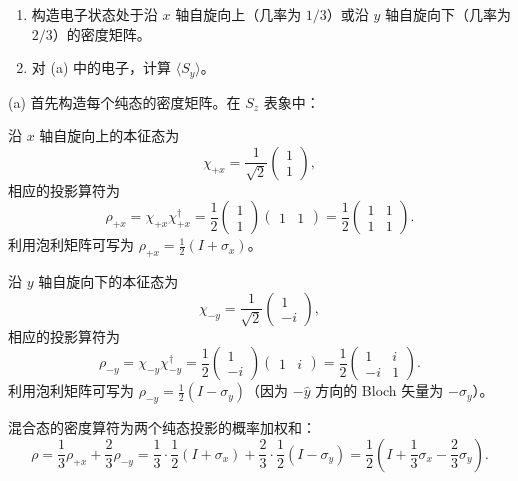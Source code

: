 \begin{question}
\begin{enumerate}
\item 构造电子状态处于沿 $x$ 轴自旋向上（几率为 $1/3$）或沿 $y$ 轴自旋向下（几率为 $2/3$）的密度矩阵。
\item 对 (a) 中的电子，计算 $\langle S_y\rangle$。
\end{enumerate}
\end{question}
\begin{solution}
(a) 首先构造每个纯态的密度矩阵。在 $S_z$ 表象中：

沿 $x$ 轴自旋向上的本征态为
\[
\chi_{+x} = \frac{1}{\sqrt{2}}\begin{pmatrix}1\\1\end{pmatrix},
\]
相应的投影算符为
\[
\rho_{+x} = \chi_{+x}\chi_{+x}^\dagger
= \frac{1}{2}\begin{pmatrix}1\\1\end{pmatrix}\begin{pmatrix}1&1\end{pmatrix}
= \frac{1}{2}\begin{pmatrix}1&1\\1&1\end{pmatrix}.
\]
利用泡利矩阵可写为 $\rho_{+x} = \frac{1}{2}(I+\sigma_x)$。

沿 $y$ 轴自旋向下的本征态为
\[
\chi_{-y} = \frac{1}{\sqrt{2}}\begin{pmatrix}1\\-i\end{pmatrix},
\]
相应的投影算符为
\[
\rho_{-y} = \chi_{-y}\chi_{-y}^\dagger
= \frac{1}{2}\begin{pmatrix}1\\-i\end{pmatrix}\begin{pmatrix}1&i\end{pmatrix}
= \frac{1}{2}\begin{pmatrix}1&i\\-i&1\end{pmatrix}.
\]
利用泡利矩阵可写为 $\rho_{-y} = \frac{1}{2}(I-\sigma_y)$（因为 $-\hat y$ 方向的 Bloch 矢量为 $-\sigma_y$）。

混合态的密度算符为两个纯态投影的概率加权和：
\[
\rho = \frac{1}{3}\rho_{+x} + \frac{2}{3}\rho_{-y}
= \frac{1}{3}\cdot\frac{1}{2}(I+\sigma_x) + \frac{2}{3}\cdot\frac{1}{2}(I-\sigma_y)
= \frac{1}{2}\left(I + \frac{1}{3}\sigma_x - \frac{2}{3}\sigma_y\right).
\]


\end{solution}
